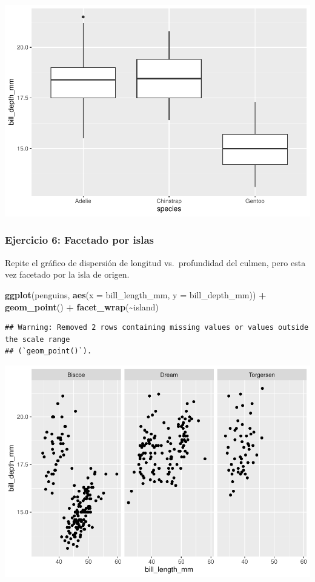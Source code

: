 \documentclass[
]{book}
\newenvironment{Shaded}{\begin{snugshade}}{\end{snugshade}}
\newcommand{\AttributeTok}[1]{\textcolor[rgb]{0.13,0.29,0.53}{#1}}
\newcommand{\FunctionTok}[1]{\textcolor[rgb]{0.13,0.29,0.53}{\textbf{#1}}}
\newcommand{\NormalTok}[1]{#1}
\newcommand{\SpecialCharTok}[1]{\textcolor[rgb]{0.81,0.36,0.00}{\textbf{#1}}}
\begin{document}
\includegraphics{bookdown-demo_files/figure-latex/unnamed-chunk-187-1.pdf}

\subsubsection{Ejercicio 6: Facetado por islas}\label{ejercicio-6-facetado-por-islas}

Repite el gráfico de dispersión de longitud vs.~profundidad del culmen, pero esta vez facetado por la isla de origen.

\begin{Shaded}
\begin{Highlighting}[]
\FunctionTok{ggplot}\NormalTok{(penguins, }\FunctionTok{aes}\NormalTok{(}\AttributeTok{x =}\NormalTok{ bill\_length\_mm, }\AttributeTok{y =}\NormalTok{ bill\_depth\_mm)) }\SpecialCharTok{+}
  \FunctionTok{geom\_point}\NormalTok{() }\SpecialCharTok{+}
  \FunctionTok{facet\_wrap}\NormalTok{(}\SpecialCharTok{\textasciitilde{}}\NormalTok{island)}
\end{Highlighting}
\end{Shaded}

\begin{verbatim}
## Warning: Removed 2 rows containing missing values or values outside the scale range
## (`geom_point()`).
\end{verbatim}

\includegraphics{bookdown-demo_files/figure-latex/unnamed-chunk-188-1.pdf}
\end{document}
